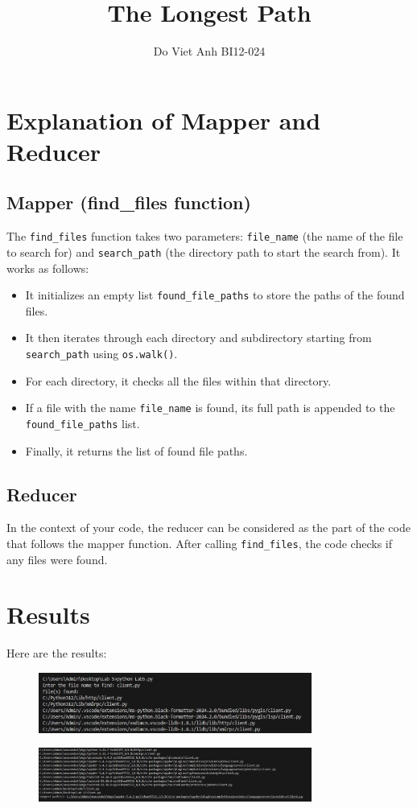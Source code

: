 \documentclass{article}
\title{The Longest Path}
\author{Do Viet Anh BI12-024}
\begin{document}

\section{Explanation of Mapper and Reducer}

\subsection{Mapper (find\_files function)}
The \texttt{find\_files} function takes two parameters: \texttt{file\_name} (the name of the file to search for) and \texttt{search\_path} (the directory path to start the search from). It works as follows:
\begin{itemize}
    \item It initializes an empty list \texttt{found\_file\_paths} to store the paths of the found files.
    \item It then iterates through each directory and subdirectory starting from \texttt{search\_path} using \texttt{os.walk()}.
    \item For each directory, it checks all the files within that directory.
    \item If a file with the name \texttt{file\_name} is found, its full path is appended to the \texttt{found\_file\_paths} list.
    \item Finally, it returns the list of found file paths.
\end{itemize}

\subsection{Reducer}
In the context of your code, the reducer can be considered as the part of the code that follows the mapper function. After calling \texttt{find\_files}, the code checks if any files were found.

\section{Results}

Here are the results:

\begin{figure}[h]
  \centering
  \includegraphics[width=0.8\textwidth]{lab5-1.png}
\end{figure}

\begin{figure}[h]
  \centering
  \includegraphics[width=0.8\textwidth]{lab5-2.png}
\end{figure}
\end{document}
